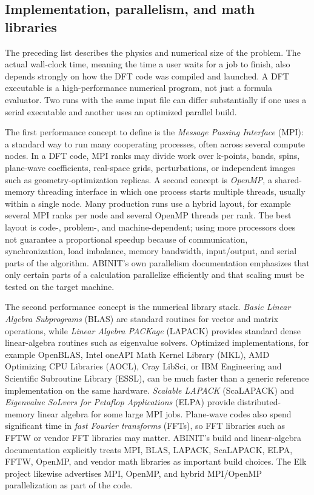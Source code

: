 \documentclass[11pt]{article}
\begin{document}
\subsection{Implementation, parallelism, and math libraries}

The preceding list describes the physics and numerical size of the problem.  The actual wall-clock time, meaning the time a user waits for a job to finish, also depends strongly on how the DFT code was compiled and launched.  A DFT executable is a high-performance numerical program, not just a formula evaluator.  Two runs with the same input file can differ substantially if one uses a serial executable and another uses an optimized parallel build.

The first performance concept to define is the \emph{Message Passing Interface} (MPI): a standard way to run many cooperating processes, often across several compute nodes.  In a DFT code, MPI ranks may divide work over k-points, bands, spins, plane-wave coefficients, real-space grids, perturbations, or independent images such as geometry-optimization replicas.  A second concept is \emph{OpenMP}, a shared-memory threading interface in which one process starts multiple threads, usually within a single node.  Many production runs use a hybrid layout, for example several MPI ranks per node and several OpenMP threads per rank.  The best layout is code-, problem-, and machine-dependent; using more processors does not guarantee a proportional speedup because of communication, synchronization, load imbalance, memory bandwidth, input/output, and serial parts of the algorithm.  ABINIT's own parallelism documentation emphasizes that only certain parts of a calculation parallelize efficiently and that scaling must be tested on the target machine.\cite{ABINIT_BASEPAR,ABINIT_PARALLEL_TOPIC}

The second performance concept is the numerical library stack.  \emph{Basic Linear Algebra Subprograms} (BLAS) are standard routines for vector and matrix operations, while \emph{Linear Algebra PACKage} (LAPACK) provides standard dense linear-algebra routines such as eigenvalue solvers.  Optimized implementations, for example OpenBLAS, Intel oneAPI Math Kernel Library (MKL), AMD Optimizing CPU Libraries (AOCL), Cray LibSci, or IBM Engineering and Scientific Subroutine Library (ESSL), can be much faster than a generic reference implementation on the same hardware.  \emph{Scalable LAPACK} (ScaLAPACK) and \emph{Eigenvalue SoLvers for Petaflop Applications} (ELPA) provide distributed-memory linear algebra for some large MPI jobs.  Plane-wave codes also spend significant time in \emph{fast Fourier transforms} (FFTs), so FFT libraries such as FFTW or vendor FFT libraries may matter.  ABINIT's build and linear-algebra documentation explicitly treats MPI, BLAS, LAPACK, ScaLAPACK, ELPA, FFTW, OpenMP, and vendor math libraries as important build choices.\cite{ABINIT_BUILD,ABINIT_LINALG,ABINIT_BASEPAR}  The Elk project likewise advertises MPI, OpenMP, and hybrid MPI/OpenMP parallelization as part of the code.\cite{ElkSite}
\end{document}
